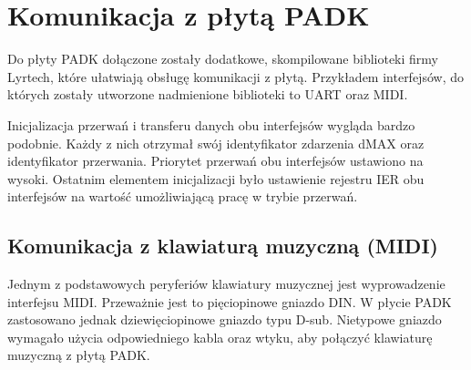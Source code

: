 \section{Komunikacja z płytą PADK}
Do płyty PADK dołączone zostały dodatkowe, skompilowane biblioteki firmy Lyrtech, które ułatwiają obsługę komunikacji z płytą. Przykładem interfejsów, do których zostały utworzone nadmienione biblioteki to UART oraz MIDI.

Inicjalizacja przerwań i transferu danych obu interfejsów wygląda bardzo podobnie. Każdy z nich otrzymał swój identyfikator zdarzenia dMAX oraz identyfikator przerwania. Priorytet przerwań obu interfejsów ustawiono na wysoki. Ostatnim elementem inicjalizacji było ustawienie rejestru IER obu interfejsów na wartość umożliwiającą pracę w trybie przerwań.

\subsection{Komunikacja z klawiaturą muzyczną  (MIDI)}
Jednym z podstawowych peryferiów klawiatury muzycznej jest wyprowadzenie interfejsu MIDI. Przeważnie jest to pięciopinowe gniazdo DIN. W płycie PADK zastosowano jednak dziewięciopinowe gniazdo typu D-sub. Nietypowe gniazdo wymagało użycia odpowiedniego kabla oraz wtyku, aby połączyć klawiaturę muzyczną z płytą PADK.

